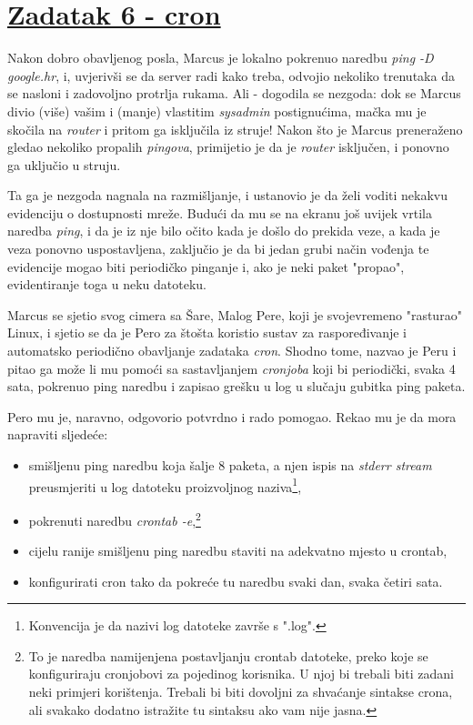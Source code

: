 \documentclass[12pt,a4paper]{article}
\begin{document}
	\section*{\underline{Zadatak 6 - cron}}
		\par Nakon dobro obavljenog posla, Marcus je lokalno pokrenuo naredbu \textit{ping -D google.hr}, i, uvjerivši se da server radi kako treba, odvojio nekoliko trenutaka da se nasloni i zadovoljno protrlja rukama. Ali - dogodila se nezgoda: dok se Marcus divio (više) vašim i (manje) vlastitim \textit{sysadmin} postignućima, mačka mu je skočila na \textit{router} i pritom ga isključila iz struje! Nakon što je Marcus preneraženo gledao nekoliko propalih \textit{pingova}, primijetio je da je \textit{router} isključen, i ponovno ga uključio u struju.
		\par Ta ga je nezgoda nagnala na razmišljanje, i ustanovio je da želi voditi nekakvu evidenciju o dostupnosti mreže. Budući da mu se na ekranu još uvijek vrtila naredba \textit{ping}, i da je iz nje bilo očito kada je došlo do prekida veze, a kada je veza ponovno uspostavljena, zaključio je da bi jedan grubi način vođenja te evidencije mogao biti periodičko pinganje i, ako je neki paket "propao", evidentiranje toga u neku datoteku.
		\par Marcus se sjetio svog cimera sa Šare, Malog Pere, koji je svojevremeno "rasturao" Linux, i sjetio se da je Pero za štošta koristio sustav za raspoređivanje i automatsko periodično obavljanje zadataka \textit{cron}. Shodno tome, nazvao je Peru i pitao ga može li mu pomoći sa sastavljanjem \textit{cronjoba} koji bi periodički, svaka 4 sata, pokrenuo ping naredbu i zapisao grešku u log u slučaju gubitka ping paketa.
		\par Pero mu je, naravno, odgovorio potvrdno i rado pomogao. Rekao mu je da mora napraviti sljedeće:
		\begin{itemize}
			\item smišljenu ping naredbu koja šalje 8 paketa, a njen ispis na \textit{stderr stream} preusmjeriti u log datoteku proizvoljnog naziva\footnote{Konvencija je da nazivi log datoteke završe s ".log".},
			\item pokrenuti naredbu \textit{crontab -e},\footnote{To je naredba namijenjena postavljanju crontab datoteke, preko koje se konfiguriraju cronjobovi za pojedinog korisnika. U njoj bi trebali biti zadani neki primjeri korištenja. Trebali bi biti dovoljni za shvaćanje sintakse crona, ali svakako dodatno istražite tu sintaksu ako vam nije jasna.}
			\item cijelu ranije smišljenu ping naredbu staviti na adekvatno mjesto u crontab,
			\item konfigurirati cron tako da pokreće tu naredbu svaki dan, svaka četiri sata.
		\end{itemize}
\end{document}
